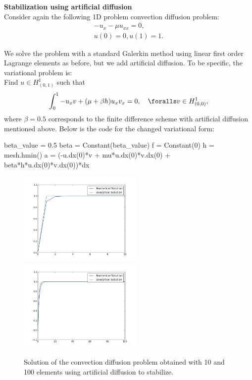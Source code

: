 \begin{example}{\textbf{Stabilization using artificial diffusion}} \label{cd:ex2} \\
Consider again the following 1D problem convection diffusion problem: 
\begin{eqnarray}
-u_x - \mu u_{xx} = 0, \\ 
u(0) = 0, u(1) = 1 . 
\end{eqnarray}

We solve the problem with a standard Galerkin method using linear first
order Lagrange elements as before, but we add artificial diffusion. To be specific, the variational problem is:  \\   
Find $u \in H^1_{(0,1)}$ such that 
\[
\int_0^1 -u_x v + (\mu + \beta h) u_x v_x = 0, \quad \foralls v \in H^1_{(0,0)},    
\]
where $\beta=0.5$ corresponds to the finite difference scheme with artificial diffusion mentioned
above.  Below is the code for the changed variational form:

\begin{python}
  beta_value = 0.5 
  beta = Constant(beta_value)
  f = Constant(0)
  h = mesh.hmin()
  a = (-u.dx(0)*v + mu*u.dx(0)*v.dx(0) + beta*h*u.dx(0)*v.dx(0))*dx  
\end{python}

\begin{figure}
\begin{center}
\includegraphics[width=6cm]{chapters/conv-diff/plots/conv-diff-stab.png}
\includegraphics[width=6cm]{chapters/conv-diff/plots/conv-diff-hr-stab.png}
\caption{Solution of the convection diffusion problem obtained with 10 and 100 elements
using artificial diffusion to stabilize.}
\label{fig:conv2}
\end{center}
\end{figure}


\end{example}
